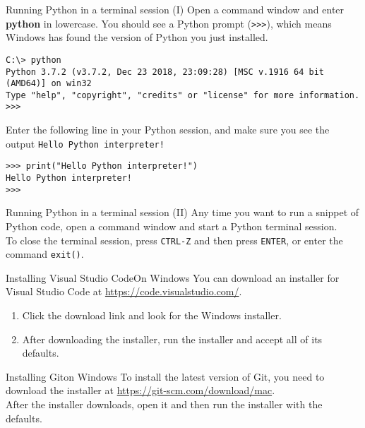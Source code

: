 \documentclass[aspectratio=169]{beamer}
\begin{document}
\begin{frame}[fragile]{Running Python in a terminal session (I)}
    Open a command window and enter \textbf{python} in lowercase.
    You should see a Python prompt (\verb|>>>|), which means Windows has found the version of Python you just installed.
    \vspace{10pt}
    \begin{Verbatim}[fontsize=\footnotesize]
C:\> python
Python 3.7.2 (v3.7.2, Dec 23 2018, 23:09:28) [MSC v.1916 64 bit (AMD64)] on win32
Type "help", "copyright", "credits" or "license" for more information.
>>>
    \end{Verbatim}
    \vspace{10pt}
    Enter the following line in your Python session, and make sure you see the output \texttt{Hello Python interpreter!}
    \vspace{10pt}
    \begin{Verbatim}[fontsize=\footnotesize]
>>> print("Hello Python interpreter!")
Hello Python interpreter!
>>>
    \end{Verbatim}
\end{frame}


\begin{frame}[fragile]{Running Python in a terminal session (II)}
    Any time you want to run a snippet of Python code, open a command window and start a Python terminal session. \\
    \vspace{10pt}
    To close the terminal session, press \texttt{CTRL-Z} and then press \texttt{ENTER}, or enter the command \texttt{exit()}.
\end{frame}


\begin{frame}[fragile]{Installing Visual Studio Code}{On Windows}
    You can download an installer for Visual Studio Code at \href{https://code.visualstudio.com/}{https://code.visualstudio.com/}.
    \vspace{10pt}
    \begin{enumerate}[label={\arabic*.},itemsep=5pt]
        \item Click the download link and look for the Windows installer.
        \item After downloading the installer, run the installer and accept all of its defaults.
    \end{enumerate}
\end{frame}


\begin{frame}{Installing Git}{on Windows}
    To install the latest version of Git, you need to download the installer at \href{https://git-scm.com/download/mac}{https://git-scm.com/download/mac}. \\
    \vspace{10pt}
    After the installer downloads, open it and then run the installer with the defaults.
\end{frame}
\end{document}
